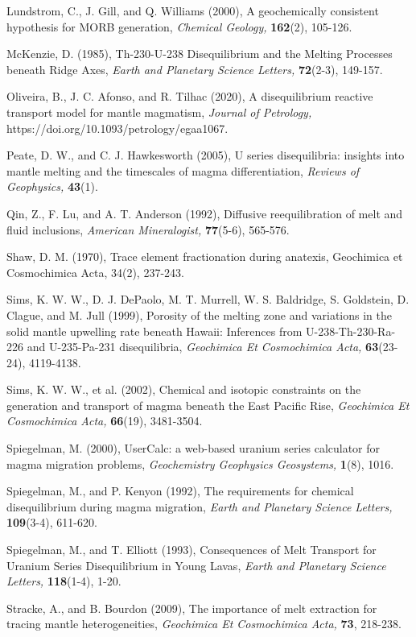 \documentclass[draft]{agujournal2019}
\begin{document}
Lundstrom, C., J. Gill, and Q. Williams (2000), A geochemically
consistent hypothesis for MORB generation, \emph{Chemical Geology,}
\textbf{162}(2), 105-126.

McKenzie, D. (1985), Th-230-U-238 Disequilibrium and the Melting
Processes beneath Ridge Axes, \emph{Earth and Planetary Science
Letters,} \textbf{72}(2-3), 149-157.

Oliveira, B., J. C. Afonso, and R. Tilhac (2020), A disequilibrium
reactive transport model for mantle magmatism, \emph{Journal of
Petrology,} https://doi.org/10.1093/petrology/egaa1067.

Peate, D. W., and C. J. Hawkesworth (2005), U series disequilibria:
insights into mantle melting and the timescales of magma
differentiation, \emph{Reviews of Geophysics,} \textbf{43}(1).

Qin, Z., F. Lu, and A. T. Anderson (1992), Diffusive reequilibration of
melt and fluid inclusions, \emph{American Mineralogist,}
\textbf{77}(5-6), 565-576.

Shaw, D. M. (1970), Trace element fractionation during anatexis,
Geochimica et Cosmochimica Acta, 34(2), 237-243.

Sims, K. W. W., D. J. DePaolo, M. T. Murrell, W. S. Baldridge, S.
Goldstein, D. Clague, and M. Jull (1999), Porosity of the melting zone
and variations in the solid mantle upwelling rate beneath Hawaii:
Inferences from U-238-Th-230-Ra-226 and U-235-Pa-231 disequilibria,
\emph{Geochimica Et Cosmochimica Acta,} \textbf{63}(23-24), 4119-4138.

Sims, K. W. W., et al. (2002), Chemical and isotopic constraints on the
generation and transport of magma beneath the East Pacific Rise,
\emph{Geochimica Et Cosmochimica Acta,} \textbf{66}(19), 3481-3504.

Spiegelman, M. (2000), UserCalc: a web-based uranium series calculator
for magma migration problems, \emph{Geochemistry Geophysics Geosystems,}
\textbf{1}(8), 1016.

Spiegelman, M., and P. Kenyon (1992), The requirements for chemical
disequilibrium during magma migration, \emph{Earth and Planetary Science
Letters,} \textbf{109}(3-4), 611-620.

Spiegelman, M., and T. Elliott (1993), Consequences of Melt Transport
for Uranium Series Disequilibrium in Young Lavas, \emph{Earth and
Planetary Science Letters,} \textbf{118}(1-4), 1-20.

Stracke, A., and B. Bourdon (2009), The importance of melt extraction
for tracing mantle heterogeneities, \emph{Geochimica Et Cosmochimica
Acta,} \textbf{73}, 218-238.
\end{document}

